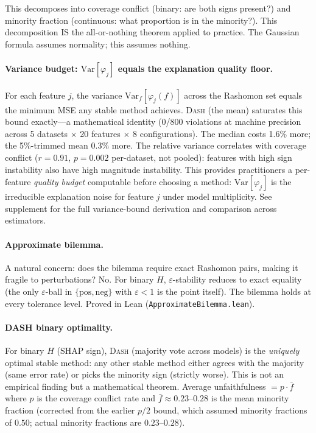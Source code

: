 \documentclass{article}
\newcommand{\Var}{\mathrm{Var}}
\newcommand{\DASH}{\textsc{Dash}}
\begin{document}
\noindent This decomposes into coverage conflict (binary: are both signs present?) and minority fraction (continuous: what proportion is in the minority?). This decomposition IS the all-or-nothing theorem applied to practice. The Gaussian formula assumes normality; this assumes nothing.

\paragraph{Variance budget: $\Var[\varphi_j]$ equals the explanation quality floor.}
For each feature $j$, the variance $\Var_f[\varphi_j(f)]$ across the Rashomon set equals the minimum MSE any stable method achieves. \DASH{} (the mean) saturates this bound exactly---a mathematical identity (0/800 violations at machine precision across 5 datasets $\times$ 20 features $\times$ 8 configurations). The median costs 1.6\% more; the 5\%-trimmed mean 0.3\% more. The relative variance correlates with coverage conflict ($r = 0.91$, $p = 0.002$ per-dataset, not pooled): features with high sign instability also have high magnitude instability. This provides practitioners a per-feature \emph{quality budget} computable before choosing a method: $\Var[\varphi_j]$ is the irreducible explanation noise for feature $j$ under model multiplicity. See supplement for the full variance-bound derivation and comparison across estimators.

\paragraph{Approximate bilemma.}
A natural concern: does the bilemma require exact Rashomon pairs, making it fragile to perturbations? No. For binary $H$, $\varepsilon$-stability reduces to exact equality (the only $\varepsilon$-ball in $\{\text{pos}, \text{neg}\}$ with $\varepsilon < 1$ is the point itself). The bilemma holds at every tolerance level. Proved in Lean (\texttt{ApproximateBilemma.lean}).

\paragraph{DASH binary optimality.}
For binary $H$ (SHAP sign), \DASH{} (majority vote across models) is the \emph{uniquely} optimal stable method: any other stable method either agrees with the majority (same error rate) or picks the minority sign (strictly worse). This is not an empirical finding but a mathematical theorem. Average unfaithfulness $= p \cdot \bar{f}$ where $p$ is the coverage conflict rate and $\bar{f} \approx 0.23$--$0.28$ is the mean minority fraction (corrected from the earlier $p/2$ bound, which assumed minority fractions of $0.50$; actual minority fractions are $0.23$--$0.28$).
\end{document}
